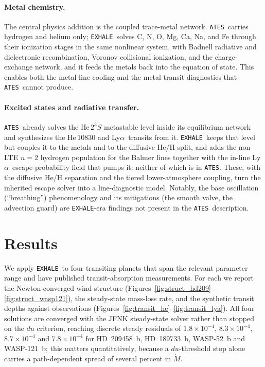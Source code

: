 \documentclass[twocolumn]{aastex702}
\newcommand{\EXHALE}{\texttt{EXHALE}}
\newcommand{\ATES}{\texttt{ATES}}
\newcommand{\Mdot}{\dot{M}}
\newcommand{\HeTS}{\mathrm{He}\,2^{3}S}
\newcommand{\Lya}{\mbox{Ly}\ensuremath{\alpha}}
\begin{document}
\paragraph{Metal chemistry.} The central physics addition is the coupled trace-metal
network. \ATES\ carries hydrogen and helium only; \EXHALE\ solves C, N, O, Mg, Ca, Na, and
Fe through their ionization stages in the same nonlinear system, with Badnell radiative
and dielectronic recombination, Voronov collisional ionization, and the \citet{Huang2023}
charge-exchange network, and it feeds the metals back into the equation of state. This enables
both the metal-line cooling and the metal transit diagnostics that \ATES\ cannot produce.

\paragraph{Excited states and radiative transfer.} \ATES\ already solves the $\HeTS$
metastable level inside its equilibrium network and synthesizes the \mbox{He\,10830} and
\Lya\ transits from it. \EXHALE\ keeps that level but couples it to the metals and to the
diffusive He/H split, and adds the non-LTE $n=2$ hydrogen population for the Balmer lines
together with the in-line \Lya\ escape-probability field that pumps it: neither of
which is in \ATES. These, with the diffusive He/H separation and the tiered lower-atmosphere coupling,
turn the inherited escape solver into a line-diagnostic model. Notably, the base
oscillation (``breathing'') phenomenology and its mitigations (the smooth valve, the
advection guard) are \EXHALE-era findings not present in the \ATES\ description.

\section{Results}
\label{sec:results}

We apply \EXHALE\ to four transiting planets that span the relevant parameter range and
have published transit-absorption measurements. For each we report the Newton-converged
wind structure (Figures~\ref{fig:struct_hd209}--\ref{fig:struct_wasp121}), the
steady-state mass-loss rate, and the synthetic transit depths against observations
(Figures~\ref{fig:transit_he}--\ref{fig:transit_lya}). All four solutions are converged
with the JFNK steady-state solver rather than stopped on the $du$ criterion, reaching
discrete steady residuals of $1.8\times10^{-4}$, $8.3\times10^{-4}$, $8.7\times10^{-4}$
and $7.8\times10^{-4}$ for HD~209458~b, HD~189733~b, WASP-52~b and WASP-121~b; this
matters quantitatively, because a $du$-threshold stop alone carries a path-dependent
spread of several percent in $\Mdot$.
\end{document}
